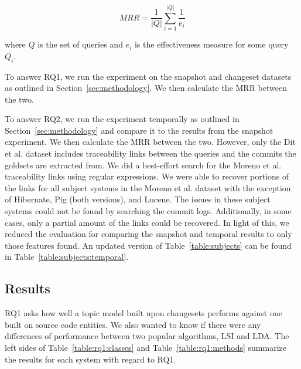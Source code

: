 \begin{equation}
    MRR = \frac{1}{|Q|} \sum_{i=1}^{|Q|} \frac{1}{e_i}
\end{equation}

where $Q$ is the set of queries
and $e_i$ is the effectiveness measure for some query $Q_i$.

To answer RQ1, we run the experiment on the snapshot and changeset
datasets as outlined in Section~\ref{sec:methodology}.
We then calculate the MRR between the two.

To answer RQ2, we run the experiment temporally as outlined in Section~\ref{sec:methodology}
and compare it to the results from the snapshot experiment.
We then calculate the MRR between the two.
However, only the Dit et al. dataset includes traceability links between
the queries and the commits the goldsets are extracted from.
We did a best-effort search for the Moreno et al. traceability links
using regular expressions.
We were able to recover portions of the links for all subject systems in
the Moreno et al. dataset with the exception of Hibernate, Pig (both versions), and Lucene.
The issues in these subject systems could not be found by searching the commit logs.
Additionally, in some cases, only a partial amount of the links could be
recovered. In light of this, we reduced the evaluation for comparing the
snapshot and temporal results to only those features found.
An updated version of Table~\ref{table:subjects} can be found in Table~\ref{table:subjects:temporal}.


\subsection{Results}



RQ1 asks how well a topic model built upon changesets performs against
one built on source code entities.
We also wanted to know if there were any differences of performance
between two popular algorithms, LSI and LDA.
The left sides of Table~\ref{table:rq1:classes} and Table~\ref{table:rq1:methods}
summarize the results for each system with regard to RQ1.

